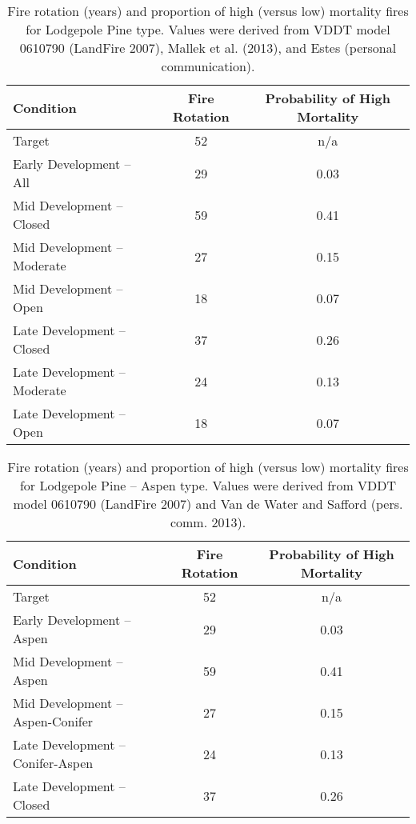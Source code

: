 \begin{table}[]
\centering
\caption{Fire rotation (years) and proportion of high (versus low) mortality fires for Lodgepole Pine type. Values were derived from VDDT model 0610790 (LandFire 2007), Mallek et al. (2013), and Estes (personal communication). }
\label{tab:lpndesc_fire}
\begin{tabular}{@{}lcc@{}}
\toprule
\textbf{Condition}          & \textbf{Fire Rotation} & \textbf{Probability of High Mortality} \\ \midrule
Target                      & 52    & n/a        \\
Early Development – All     & 29    & 0.03       \\
Mid Development – Closed    & 59    & 0.41       \\
Mid Development – Moderate  & 27    & 0.15       \\
Mid Development – Open      & 18    & 0.07       \\
Late Development – Closed   & 37    & 0.26       \\
Late Development – Moderate & 24    & 0.13       \\
Late Development – Open     & 18    & 0.07       \\ \bottomrule
\end{tabular}
\end{table}

\begin{table}[]
\centering
\caption{Fire rotation (years) and proportion of high (versus low) mortality fires for Lodgepole Pine – Aspen type. Values were derived from VDDT model 0610790 (LandFire 2007) and Van de Water and Safford (pers. comm. 2013).}
\label{tab:lpnaspdesc_fire}
\begin{tabular}{@{}lcc@{}}
\toprule
\textbf{Condition}               & \textbf{Fire Rotation} & \textbf{Probability of High Mortality} \\ \midrule
Target                           & 52     & n/a        \\
Early Development – Aspen        & 29     & 0.03       \\
Mid Development – Aspen          & 59     & 0.41       \\
Mid Development – Aspen-Conifer  & 27     & 0.15       \\
Late Development – Conifer-Aspen & 24     & 0.13       \\
Late Development – Closed        & 37     & 0.26       \\ \bottomrule
\end{tabular}
\end{table}

